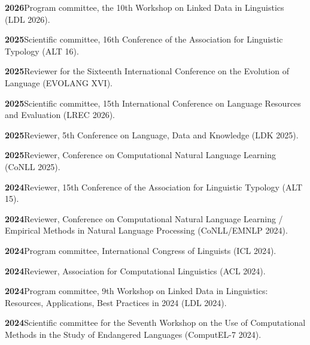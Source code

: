 \documentclass[11pt]{article}
\newcommand{\hangpara}{
 \setlength{\parindent}{0in} %
 \hangindent=0.42in %
}
\begin{document}
\hangpara
\vskip 6pt
{\bf 2026}\hspace{1ex}Program committee, the 10th Workshop on Linked Data in Linguistics (LDL 2026).

\vskip 6pt
\hangpara
{\bf 2025}\hspace{1ex}Scientific committee, 16th Conference of the Association for Linguistic Typology (ALT 16).

\hangpara
\vskip 6pt
{\bf 2025}\hspace{1ex}Reviewer for the Sixteenth International Conference on the Evolution of Language (EVOLANG XVI).

\hangpara
\vskip 6pt
{\bf 2025}\hspace{1ex}Scientific committee, 15th International Conference on Language Resources and Evaluation (LREC 2026).

\hangpara
\vskip 6pt
{\bf 2025}\hspace{1ex}Reviewer, 5th Conference on Language, Data and Knowledge (LDK 2025).

\hangpara
\vskip 6pt
{\bf 2025}\hspace{1ex}Reviewer, Conference on Computational Natural Language Learning (CoNLL 2025).

\hangpara
\vskip 6pt
{\bf 2024}\hspace{1ex}Reviewer, 15th Conference of the Association for Linguistic Typology (ALT 15).

\hangpara
\vskip 6pt
{\bf 2024}\hspace{1ex}Reviewer, Conference on Computational Natural Language Learning / Empirical Methods in Natural Language Processing (CoNLL/EMNLP 2024).

\hangpara
\vskip 6pt
{\bf 2024}\hspace{1ex}Program committee, International Congress of Linguists (ICL 2024).

\hangpara
\vskip 6pt
{\bf 2024}\hspace{1ex}Reviewer, Association for Computational Linguistics (ACL 2024).

\hangpara
\vskip 6pt
{\bf 2024}\hspace{1ex}Program committee, 9th Workshop on Linked Data in Linguistics: Resources, Applications, Best Practices in 2024 (LDL 2024).

\hangpara
\vskip 6pt
{\bf 2024}\hspace{1ex}Scientific committee for the Seventh Workshop on the Use of Computational Methods in the Study of Endangered Languages (ComputEL-7 2024).
\end{document}
